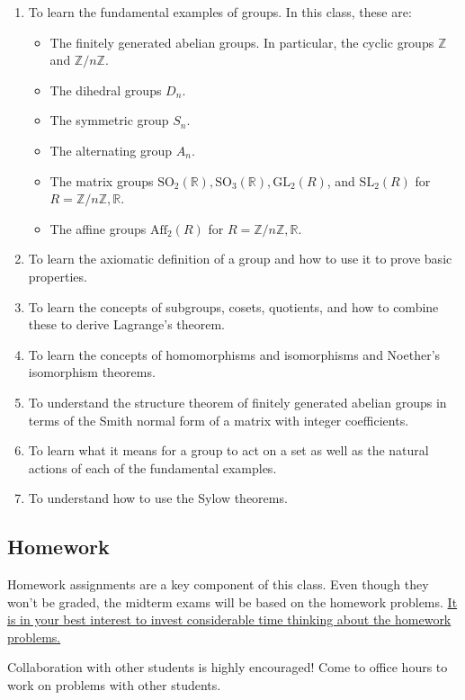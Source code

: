 \documentclass[11pt]{article}
\begin{document}
\begin{enumerate}
\item To learn the fundamental examples of groups. In this class, these are:
\begin{itemize}
\item The finitely generated abelian groups. In particular, the cyclic groups
\(\mathbb{Z}\) and \(\mathbb{Z}/n\mathbb{Z}\).
\item The dihedral groups \(D_{n}.\)
\item The symmetric group \(S_{n}.\)
\item The alternating group \(A_{n}.\)
\item The matrix groups \(\mathrm{SO}_2(\mathbb{R}), \mathrm{SO}_3(\mathbb{R}),
     \mathrm{GL}_2(R)\), and \(\mathrm{SL}_2(R)\) for \(R = \mathbb{Z}/n\mathbb{Z}, \mathbb{R}\).
\item The affine groups \(\mathrm{Aff}_2(R)\) for \(R =
     \mathbb{Z}/n\mathbb{Z}, \mathbb{R}\).
\end{itemize}

\item To learn the axiomatic definition of a group and how to use it to prove
basic properties.
\item To learn the concepts of subgroups, cosets, quotients, and how to combine
these to derive Lagrange’s theorem.
\item To learn the concepts of homomorphisms and isomorphisms and Noether's
isomorphism theorems.
\item To understand the structure theorem of finitely generated abelian groups in
terms of the Smith normal form of a matrix with integer coefficients.
\item To learn what it means for a group to act on a set as well as the
natural actions of each of the fundamental examples.
\item To understand how to use the Sylow theorems.
\end{enumerate}

\subsection*{Homework}
\label{sec:org06b116b}
Homework assignments are a key component of this class. Even though they won't
be graded, the midterm exams will be based on the homework problems. \uline{It is in
your best interest to invest considerable time thinking about the homework
problems.}

Collaboration with other students is highly encouraged! Come to office hours to
work on problems with other students.
\end{document}
